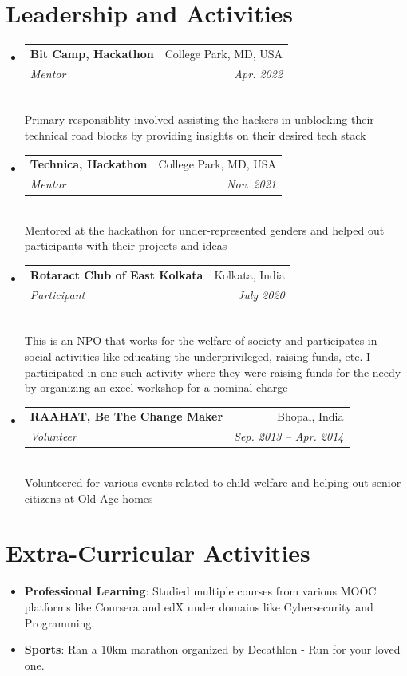 \documentclass[letterpaper,11pt]{article}
\makeatletter
\newcommand{\resumeSubheading}[4]{
  \vspace{-2pt}\item
    \begin{tabular*}{0.97\textwidth}[t]{l@{\extracolsep{\fill}}r}
      \textbf{#1} & #2 \\
      \textit{\small#3} & \textit{\small #4} \\
    \end{tabular*}\vspace{-7pt}
}
\newcommand{\resumeSubHeadingListStart}{\begin{itemize}[leftmargin=0.15in, label={}]}
\newcommand{\resumeSubHeadingListEnd}{\end{itemize}}
\makeatother
\begin{document}
\section{Leadership and Activities}
 \resumeSubHeadingListStart
  \resumeSubheading
     {Bit Camp, Hackathon}{College Park, MD, USA}
     {Mentor}{Apr. 2022} \vspace{2px} \\
     {Primary responsiblity involved assisting the hackers in unblocking their technical road blocks by providing insights on their desired tech stack}
  \resumeSubheading
     {Technica, Hackathon}{College Park, MD, USA}
     {Mentor}{Nov. 2021} \vspace{2px} \\
     {Mentored at the hackathon for under-represented genders and helped out participants with their projects and ideas}
  \resumeSubheading
     {Rotaract Club of East Kolkata}{Kolkata, India}
     {Participant}{July 2020} \vspace{2px} \\
     {This is an NPO that works for the welfare of society and participates in social activities like educating the underprivileged, raising funds, etc. I participated in one such activity where they were raising funds for the needy by organizing an excel workshop for a nominal charge}
  \resumeSubheading
     {RAAHAT, Be The Change Maker}{Bhopal, India}
     {Volunteer}{Sep. 2013 -- Apr. 2014} \vspace{2px} \\
     {Volunteered for various events related to child welfare and helping out senior citizens at Old Age homes}
 \resumeSubHeadingListEnd

\section{Extra-Curricular Activities}
 \begin{itemize}
     \item { \textbf {Professional Learning}{: Studied multiple courses from various MOOC platforms like Coursera and edX under domains like Cybersecurity and Programming.}}
     \item {\textbf {Sports}{: Ran a 10km marathon organized by Decathlon - Run for your loved one.}}
 \end{itemize}

\end{document}
